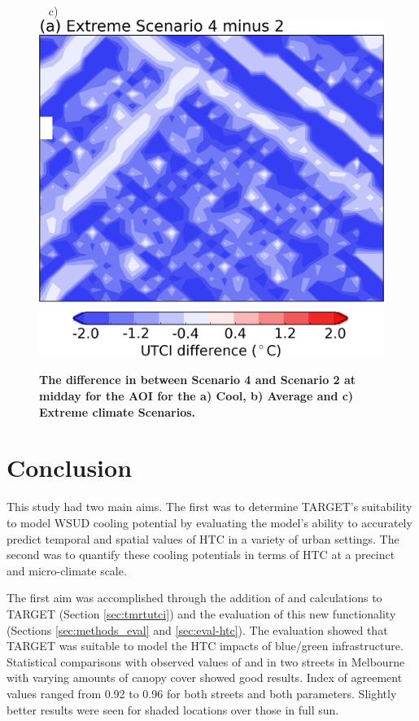 \documentclass[final,3p,times,authoryear]{elsarticle}
\begin{document}
\begin{figure}[!htbp]
~
c)\includegraphics[scale=0.30,trim = 0mm 0mm 0mm 8mm,clip]{images/fig4c} 
\caption{\bf The difference in  between Scenario 4 and Scenario 2 at midday for the AOI for the a) Cool, b) Average and c) Extreme climate Scenarios.}    
 \label{fig:fig4} 
\end{figure} 


\section{Conclusion}\label{sec:conclusion}
This study had two main aims. The first was to determine TARGET's suitability to model WSUD cooling potential by evaluating the model's ability to accurately predict temporal and spatial values of HTC in a variety of urban settings. The second was to quantify these cooling potentials in terms of HTC at a precinct and micro-climate scale.

The first aim was accomplished through the addition of  and  calculations to TARGET (Section \ref{sec:tmrtutci}) and the evaluation of this new functionality (Sections \ref{sec:methods_eval} and \ref{sec:eval-htc}). The evaluation showed that TARGET was suitable to model the HTC impacts of blue/green infrastructure. Statistical comparisons with observed values of  and  in two streets in Melbourne with varying amounts of canopy cover showed good results. Index of agreement values ranged from 0.92 to 0.96 for both streets and both parameters. Slightly better results were seen for shaded locations over those in full sun.
\end{document}
